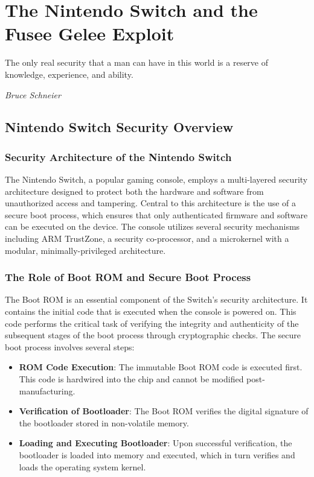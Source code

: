 \chapter{The Nintendo Switch and the Fusee Gelee Exploit}
\epigraph{The only real security that a man can have in this world is a reserve of knowledge, experience, and ability.}{\textit{Bruce Schneier}}

\section{Nintendo Switch Security Overview}

\subsection{Security Architecture of the Nintendo Switch}

The Nintendo Switch, a popular gaming console, employs a multi-layered security architecture designed to protect both the hardware and software from unauthorized access and tampering. Central to this architecture is the use of a secure boot process, which ensures that only authenticated firmware and software can be executed on the device. The console utilizes several security mechanisms including ARM TrustZone, a security co-processor, and a microkernel with a modular, minimally-privileged architecture.

\subsection{The Role of Boot ROM and Secure Boot Process}

The Boot ROM is an essential component of the Switch's security architecture. It contains the initial code that is executed when the console is powered on. This code performs the critical task of verifying the integrity and authenticity of the subsequent stages of the boot process through cryptographic checks. The secure boot process involves several steps:

\begin{itemize}
    \item \textbf{ROM Code Execution}: The immutable Boot ROM code is executed first. This code is hardwired into the chip and cannot be modified post-manufacturing.
    \item \textbf{Verification of Bootloader}: The Boot ROM verifies the digital signature of the bootloader stored in non-volatile memory.
    \item \textbf{Loading and Executing Bootloader}: Upon successful verification, the bootloader is loaded into memory and executed, which in turn verifies and loads the operating system kernel.
\end{itemize}

